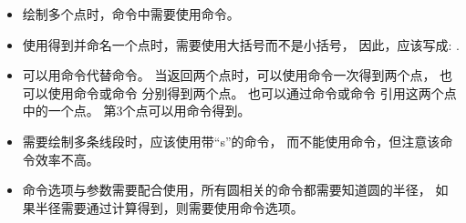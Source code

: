 \documentclass[../main.tex]{subfiles}
\begin{document}
\begin{itemize}\setlength{\itemsep}{10pt}
\item 绘制多个点时，命令中需要使用命令。

\item 使用得到并命名一个点时，需要使用大括号而不是小括号，
因此，应该写成: .

\item 可以用命令代替命令。
当返回两个点时，可以使用命令一次得到两个点，
也可以使用命令或命令
分别得到两个点。
也可以通过命令或命令
引用这两个点中的一个点。
第3个点可以用命令得到。

\item 需要绘制多条线段时，应该使用带\enquote{s}的命令，
而不能使用命令，但注意该命令效率不高。

\item 命令选项与参数需要配合使用，所有圆相关的命令都需要知道圆的半径，
如果半径需要通过计算得到，则需要使用命令选项。


\end{itemize}
\end{document}
